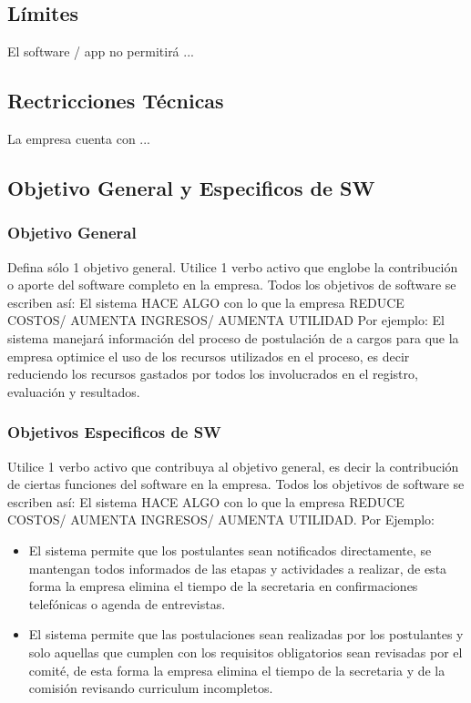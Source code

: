 \subsection{Límites}

El software / app no permitirá ...

\subsection{Rectricciones Técnicas}

La empresa cuenta con ...

\subsection{Objetivo General y Especificos de SW}

\subsubsection{Objetivo General}

Defina sólo 1 objetivo general. Utilice 1 verbo activo que englobe la contribución o aporte del software completo en la empresa. Todos los objetivos de software se escriben así: El sistema HACE ALGO con lo que la empresa REDUCE COSTOS/ AUMENTA  INGRESOS/ AUMENTA UTILIDAD 
Por ejemplo: El sistema manejará información del proceso de postulación de a cargos para que la empresa optimice el uso de los recursos utilizados en el proceso, es decir reduciendo los recursos gastados por todos los involucrados en el registro, evaluación y resultados.

\subsubsection{Objetivos Especificos de SW}

Utilice 1 verbo activo que contribuya al objetivo general, es decir la contribución de ciertas funciones del software en la empresa. Todos los objetivos de software se escriben así: El sistema HACE ALGO con lo que la empresa REDUCE COSTOS/ AUMENTA  INGRESOS/ AUMENTA UTILIDAD. Por Ejemplo: 
\begin{itemize}
    \item El sistema permite que los postulantes sean notificados directamente, se mantengan todos informados de las etapas y actividades a realizar, de esta forma la empresa elimina el tiempo de la secretaria en confirmaciones telefónicas o agenda de entrevistas.
    \item El sistema permite que las postulaciones sean realizadas por los postulantes y solo aquellas que cumplen con los requisitos obligatorios sean revisadas por el comité, de esta forma la empresa elimina el tiempo de la secretaria y de la comisión revisando curriculum incompletos.
\end{itemize}

